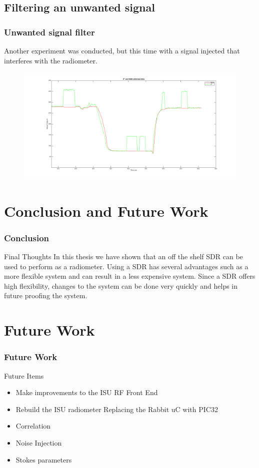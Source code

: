 \documentclass[notes]{beamer}
\begin{document}
\subsection{Filtering an unwanted signal}
\begin{frame}
\frametitle{Unwanted signal filter}
Another experiment was conducted, but this time with a signal injected that interferes with the radiometer.
\begin{figure}\label{filter_signal}
\includegraphics[width=1.0\linewidth]{images/moneyshot.png}
\end{figure} 
\end{frame}
\section{Conclusion and Future Work}
\begin{frame}
\frametitle{Conclusion}
\begin{block}{Final Thoughts}
In this thesis we have shown that an off the shelf SDR can be used to perform as a radiometer.  Using a SDR has several advantages such as a more flexible system and can result in a less expensive system.  Since a SDR offers high flexibility, changes to the system can be done very quickly and helps in future proofing the system.  
\end{block}
\end{frame}
\section{Future Work}
\begin{frame}
\frametitle{Future Work}
\begin{block}{Future Items}
\begin{itemize}
\item Make improvements to the ISU RF Front End
\item Rebuild the ISU radiometer
\note Replacing the Rabbit uC with PIC32
\item Correlation
\item Noise Injection
\item Stokes parameters
\end{itemize}
\end{block}
\end{frame}
\end{document}
